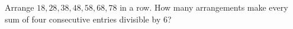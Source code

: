 Arrange $18,28,38,48,58,68,78$ in a row. How many arrangements make every sum of four consecutive entries divisible by $6$?
